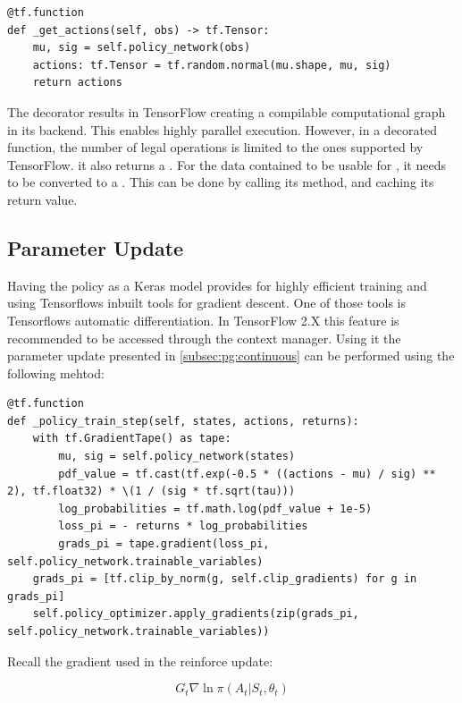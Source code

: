 \begin{lstlisting}[basicstyle=\footnotesize]
@tf.function
def _get_actions(self, obs) -> tf.Tensor:
    mu, sig = self.policy_network(obs)
    actions: tf.Tensor = tf.random.normal(mu.shape, mu, sig)
    return actions
\end{lstlisting}

\noindent
The  decorator results in TensorFlow creating a compilable computational graph in its backend. This enables highly parallel execution. However, in a  decorated function, the number of legal operations is limited to the ones supported by TensorFlow. it also returns a . For the data contained to be usable for , it needs to be converted to a . This can be done by calling its  method, and caching its return value. 

\subsection{Parameter Update}\label{subsec:ip:agent:training_func}
Having the policy as a Keras model provides for highly efficient training and using Tensorflows inbuilt tools for gradient descent. One of those tools is Tensorflows automatic differentiation. In TensorFlow 2.X this feature is recommended to be accessed through the  context manager. Using it the parameter update presented in \ref{subsec:pg:continuous} can be performed using the following mehtod:

\begin{lstlisting}[basicstyle=\footnotesize]
@tf.function
def _policy_train_step(self, states, actions, returns):
    with tf.GradientTape() as tape:
        mu, sig = self.policy_network(states)
        pdf_value = tf.cast(tf.exp(-0.5 * ((actions - mu) / sig) ** 2), tf.float32) * \(1 / (sig * tf.sqrt(tau)))
        log_probabilities = tf.math.log(pdf_value + 1e-5)
        loss_pi = - returns * log_probabilities
        grads_pi = tape.gradient(loss_pi, self.policy_network.trainable_variables)
    grads_pi = [tf.clip_by_norm(g, self.clip_gradients) for g in grads_pi]
    self.policy_optimizer.apply_gradients(zip(grads_pi, self.policy_network.trainable_variables))
\end{lstlisting}

\noindent
Recall the gradient used in the reinforce update:

\begin{equation*}
    G_t \nabla \ln{\pi(A_t | S_t, \theta_t)}
\end{equation*}

